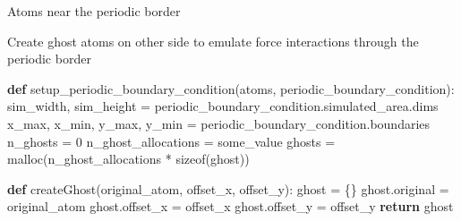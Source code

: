 \documentclass[ignorenonframetext,]{beamer}
\newenvironment{Shaded}{}{}
\newcommand{\ControlFlowTok}[1]{\textcolor[rgb]{0.00,0.44,0.13}{\textbf{#1}}}
\newcommand{\DecValTok}[1]{\textcolor[rgb]{0.25,0.63,0.44}{#1}}
\newcommand{\KeywordTok}[1]{\textcolor[rgb]{0.00,0.44,0.13}{\textbf{#1}}}
\newcommand{\NormalTok}[1]{#1}
\newcommand{\OperatorTok}[1]{\textcolor[rgb]{0.40,0.40,0.40}{#1}}
\begin{document}
\begin{frame}[fragile]

\begin{block}{Atoms near the periodic border}

Create ghost atoms on other side to emulate force interactions through
the periodic border

\begin{Shaded}
\begin{Highlighting}[]
\KeywordTok{def}\NormalTok{ setup_periodic_boundary_condition(atoms, periodic_boundary_condition):}
\NormalTok{  sim_width, sim_height }\OperatorTok{=}\NormalTok{ periodic_boundary_condition.simulated_area.dims}
\NormalTok{  x_max, x_min, y_max, y_min }\OperatorTok{=}\NormalTok{ periodic_boundary_condition.boundaries}
\NormalTok{  n_ghosts }\OperatorTok{=} \DecValTok{0}
\NormalTok{  n_ghost_allocations }\OperatorTok{=}\NormalTok{ some_value}
\NormalTok{  ghosts }\OperatorTok{=}\NormalTok{ malloc(n_ghost_allocations }\OperatorTok{*}\NormalTok{ sizeof(ghost))}
  
  \KeywordTok{def}\NormalTok{ createGhost(original_atom, offset_x, offset_y):}
\NormalTok{    ghost }\OperatorTok{=}\NormalTok{ \{\}}
\NormalTok{    ghost.original }\OperatorTok{=}\NormalTok{ original_atom}
\NormalTok{    ghost.offset_x }\OperatorTok{=}\NormalTok{ offset_x}
\NormalTok{    ghost.offset_y }\OperatorTok{=}\NormalTok{ offset_y}
    \ControlFlowTok{return}\NormalTok{ ghost}
  

\end{Highlighting}
\end{Shaded}
\end{block}
\end{frame}
\end{document}
